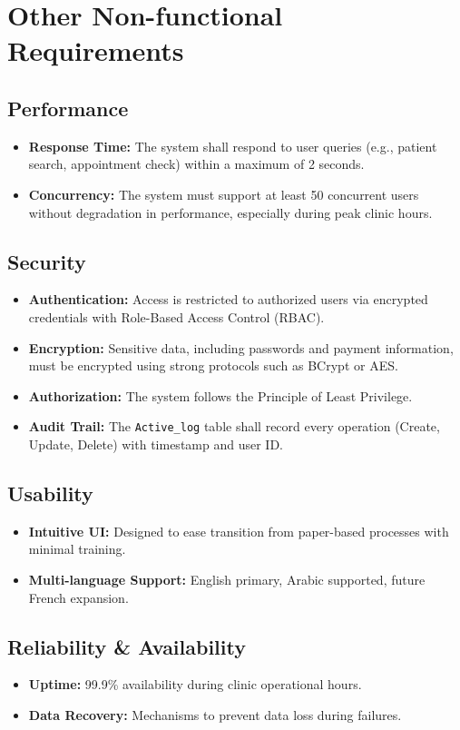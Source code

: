 \section{Other Non-functional Requirements}

\subsection{Performance}
\begin{itemize}
	\item \textbf{Response Time:} The system shall respond to user queries (e.g., patient search, appointment check) within a maximum of 2 seconds.
	\item \textbf{Concurrency:} The system must support at least 50 concurrent users without degradation in performance, especially during peak clinic hours.
\end{itemize}

\subsection{Security}
\begin{itemize}
	\item \textbf{Authentication:} Access is restricted to authorized users via encrypted credentials with Role-Based Access Control (RBAC).
	\item \textbf{Encryption:} Sensitive data, including passwords and payment information, must be encrypted using strong protocols such as BCrypt or AES.
	\item \textbf{Authorization:} The system follows the Principle of Least Privilege.
	\item \textbf{Audit Trail:} The \texttt{Active\_log} table shall record every operation (Create, Update, Delete) with timestamp and user ID.
\end{itemize}

\subsection{Usability}
\begin{itemize}
	\item \textbf{Intuitive UI:} Designed to ease transition from paper-based processes with minimal training.
	\item \textbf{Multi-language Support:} English primary, Arabic supported, future French expansion.
\end{itemize}

\subsection{Reliability \& Availability}
\begin{itemize}
	\item \textbf{Uptime:} 99.9\% availability during clinic operational hours.
	\item \textbf{Data Recovery:} Mechanisms to prevent data loss during failures.
\end{itemize}

